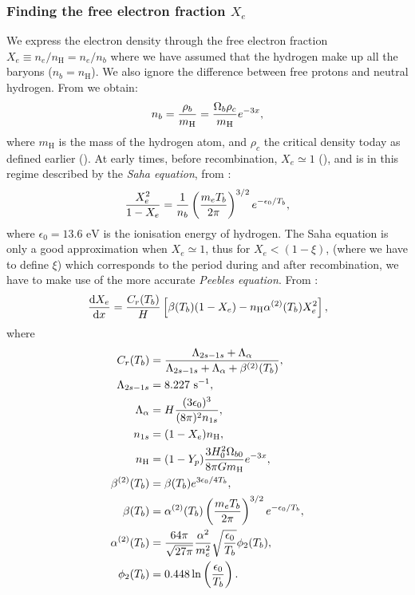     \subsubsection{Finding the free electron fraction $X_e$}
    We express the electron density through the free electron fraction $X_e \equiv n_e/n_\mathrm{H} = n_e/n_b$ where we have assumed that the hydrogen make up all the baryons ($n_b=n_\mathrm{H}$). We also ignore the difference between free protons and neutral hydrogen. From \cite{https://doi.org/10.48550/arxiv.astro-ph/0606683} we obtain:
    \begin{equation}
        n_b = \frac{\rho_b}{m_\mathrm{H}} = \frac{\Omega_b\rho_c}{m_\mathrm{H}}e^{-3x},
    \end{equation}
    where $m_\mathrm{H}$ is the mass of the hydrogen atom, and $\rho_c$ the critical density today as defined earlier (). At early times, before recombination, $X_e \simeq 1$ (), and is in this regime described by the \textit{Saha equation}, from \cite{dodelson2020modern}:
    \begin{equation}\label{eq:m2:theory:Saha_equation}
        \frac{X_e^2}{1-X_e} = \frac{1}{n_b}\left(\frac{m_eT_b}{2\pi}\right)^{3/2}e^{-\epsilon_0/T_b},
    \end{equation}
    where $\epsilon_0 = 13.6\text{ eV}$ is the ionisation energy of hydrogen. The Saha equation is only a good approximation when $X_e \simeq 1$, thus for $X_e < (1-\xi)$, (where we have to define $\xi$) which corresponds to the period during and after recombination, we have to make use of the more accurate \textit{Peebles equation}. From \cite{https://doi.org/10.48550/arxiv.astro-ph/0606683}:
    \begin{equation}\label{eq:m2:theory:peebles_equation}
        \dv{X_e}{x} = \frac{C_r(T_b)}{H}\left[\beta(T_b)(1-X_e)-n_\mathrm{H}\alpha^{(2)}(T_b)X_e^2\right],
    \end{equation}
    where
    \begin{equation}
        \begin{split}
            C_r(T_b) &= \frac{\Lambda_{2s-1s}+\Lambda_\alpha}{\Lambda_{2s-1s} + \Lambda_\alpha+\beta^{(2)}(T_b)}, \\
            \Lambda_{2s-1s} &= 8.227 \text{ {s}}^{-1}, \\
            \Lambda_\alpha &= H\frac{(3\epsilon_0)^3}{(8\pi)^2n_{1s}}, \\
            n_{1s} &=(1-X_e)n_\mathrm{H}, \\
            n_\mathrm{H} &= (1-Y_p)\frac{3H_0^2\Omega_{b0}}{8\pi Gm_\mathrm{H}}e^{-3x},\\
            \beta^{(2)}(T_b) &= \beta(T_b)e^{3\epsilon_0/4T_b}, \\
            \beta(T_b) &= \alpha^{(2)}(T_b)\left(\frac{m_eT_b}{2\pi}\right)^{3/2}e^{-\epsilon_0/T_b}, \\
            \alpha^{(2)}(T_b) &=\frac{64\pi}{\sqrt{27\pi}}\frac{\alpha^2}{m_e^2}\sqrt{\frac{\epsilon_0}{T_b}}\phi_2(T_b), \\
            \phi_2(T_b) &= 0.448\ln\left(\frac{\epsilon_0}{T_b}\right).
        \end{split}
    \end{equation}

